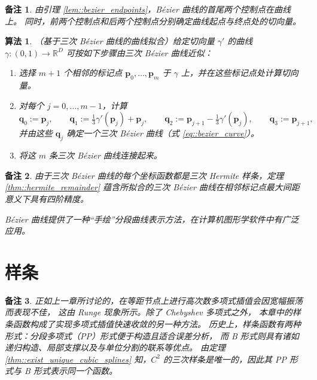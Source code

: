 \documentclass[a4paper]{ctexart}
\newtheorem{remark}{备注}
\newtheorem{algorithm}[theorem]{算法}
\numberwithin{theorem}{section}
\numberwithin{equation}{section}
\numberwithin{figure}{section}
\numberwithin{remark}{section}
\begin{document}
\begin{remark}
由引理 \ref{lem::bezier_endpoints}，Bézier 曲线的首尾两个控制点在曲线上。
同时，前两个控制点和后两个控制点分别确定曲线起点与终点处的切向量。
\end{remark}

\begin{algorithm}
（基于三次 Bézier 曲线的曲线拟合）给定切向量 $\gamma'$ 的曲线 $\gamma:(0,1)\to\mathbb{R}^{D}$ 可按如下步骤由三次 Bézier 曲线近似：
\begin{enumerate}
\item 选择 $m+1$ 个相邻的标记点 $\mathbf{p}_0,\ldots,\mathbf{p}_m$ 于 $\gamma$ 上，并在这些标记点处计算切向量。
\item 对每个 $j=0,\ldots,m-1$，计算
\begin{equation*}
\mathbf{q}_0:=\mathbf{p}_j,\qquad
\mathbf{q}_1:=\tfrac{1}{3}\gamma'(\mathbf{p}_j)+\mathbf{p}_j,\qquad
\mathbf{q}_2:=\mathbf{p}_{j+1}-\tfrac{1}{3}\gamma'(\mathbf{p}_j),\qquad
\mathbf{q}_3:=\mathbf{p}_{j+1},
\end{equation*}
并由这些 $\mathbf{q}_j$ 确定一个三次 Bézier 曲线（式 \ref{eq::bezier_curve}）。
\item 将这 $m$ 条三次 Bézier 曲线连接起来。
\end{enumerate}
\end{algorithm}

\begin{remark}
由于三次 Bézier 曲线的每个坐标函数都是三次 Hermite 样条，定理 \ref{thm::hermite_remainder} 
蕴含所拟合的三次 Bézier 曲线在相邻标记点最大间距意义下具有四阶精度。

Bézier 曲线提供了一种“手绘”分段曲线表示方法，在计算机图形学软件中有广泛应用。
\end{remark}

\section{样条}

\begin{remark}
正如上一章所讨论的，在等距节点上进行高次数多项式插值会因宽幅振荡而表现不佳，
这由 Runge 现象所示。除了 Chebyshev 多项式之外，
本章中的样条函数构成了实现多项式插值快速收敛的另一种方法。
历史上，样条函数有两种形式：分段多项式（PP）形式便于构造且适合误差分析，
而 B 形式则具有诸如递归构造、局部支撑以及与单位分割的联系等优点。
由定理 \ref{thm::exist_unique_cubic_splines} 知，$C^2$ 的三次样条是唯一的，因此其 PP 形式与 B 形式表示同一个函数。
\end{remark}
\end{document}
